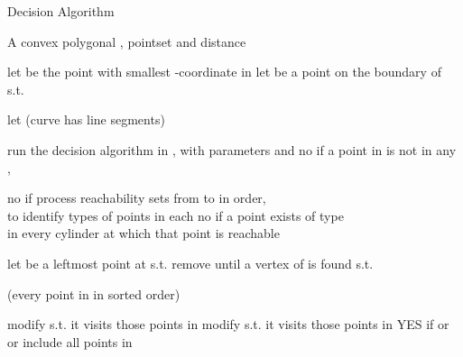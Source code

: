 \documentclass[a4paper,UKenglish]{lipics}
\begin{document}
\begin{algorithm} [h]
\caption {{\sc Decision Algorithm }} 
\label{alg:dec}
\begin{algorithmic}[1]	
		\baselineskip

	\vspace{0.3em}
	\REQUIRE  A convex polygonal , pointset  and distance 

\STATE let  be the point with 
smallest -coordinate in 
\STATE let  be a point on the boundary of 
s.t.   

\STATE let  (curve  has  line segments) 

\vspace{0.1 in}
	\STATE run the decision algorithm in \cite{cccg11}, 
	with parameters  and 
	 {\sc no} if a point in  
is not in any ,   \label{l:everyReach}

	 {\sc no} if  \label{l:last}
	\STATE process reachability sets from  to  in order, \\to identify types of points in each  \label{l:identifytypes}
	 {\sc no} if a point exists of type   \\ in every cylinder at which that point is reachable  \label{l:B3}

\label{l:typeB}


	
\vspace{0.2 in}
\STATE   \label{l:init1}
	\STATE   \label{l:init1}
 	 \label{l:forCyl}	
			\STATE let  be a leftmost point at   s.t.    \label{l:leftmost}	
	\IF { }	 \label{l:con}	
			\STATE remove  until a vertex  of  is found s.t.  \label{l:rightmost} \\
	\ENDIF
	\STATE 
 
(every point in  in sorted  order)



	\ENDFOR



	\STATE  modify  s.t. it visits those points in  \label{l:lasttwo1}
	\STATE  modify  s.t. it visits those points in 
\label{l:lasttwo2}
	\ENDIF
	 {\sc YES} if  or  or  include all points in 

\end{algorithmic}
\end{algorithm}
\end{document}
